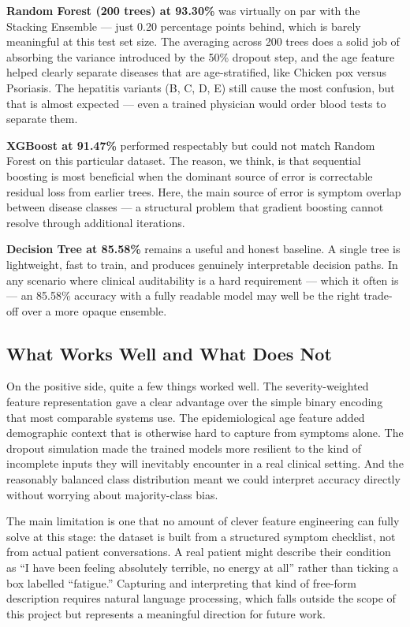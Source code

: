 \documentclass[12pt,a4paper]{article}
\begin{document}
\textbf{Random Forest (200 trees) at 93.30\%} was virtually on par with the Stacking Ensemble --- just 0.20 percentage points behind, which is barely meaningful at this test set size. The averaging across 200 trees does a solid job of absorbing the variance introduced by the 50\% dropout step, and the age feature helped clearly separate diseases that are age-stratified, like Chicken pox versus Psoriasis. The hepatitis variants (B, C, D, E) still cause the most confusion, but that is almost expected --- even a trained physician would order blood tests to separate them.

\textbf{XGBoost at 91.47\%} performed respectably but could not match Random Forest on this particular dataset. The reason, we think, is that sequential boosting is most beneficial when the dominant source of error is correctable residual loss from earlier trees. Here, the main source of error is symptom overlap between disease classes --- a structural problem that gradient boosting cannot resolve through additional iterations.

\textbf{Decision Tree at 85.58\%} remains a useful and honest baseline. A single tree is lightweight, fast to train, and produces genuinely interpretable decision paths. In any scenario where clinical auditability is a hard requirement --- which it often is --- an 85.58\% accuracy with a fully readable model may well be the right trade-off over a more opaque ensemble.

\subsection{What Works Well and What Does Not}

On the positive side, quite a few things worked well. The severity-weighted feature representation gave a clear advantage over the simple binary encoding that most comparable systems use. The epidemiological age feature added demographic context that is otherwise hard to capture from symptoms alone. The dropout simulation made the trained models more resilient to the kind of incomplete inputs they will inevitably encounter in a real clinical setting. And the reasonably balanced class distribution meant we could interpret accuracy directly without worrying about majority-class bias.

The main limitation is one that no amount of clever feature engineering can fully solve at this stage: the dataset is built from a structured symptom checklist, not from actual patient conversations. A real patient might describe their condition as ``I have been feeling absolutely terrible, no energy at all'' rather than ticking a box labelled ``fatigue.'' Capturing and interpreting that kind of free-form description requires natural language processing, which falls outside the scope of this project but represents a meaningful direction for future work.
\end{document}
